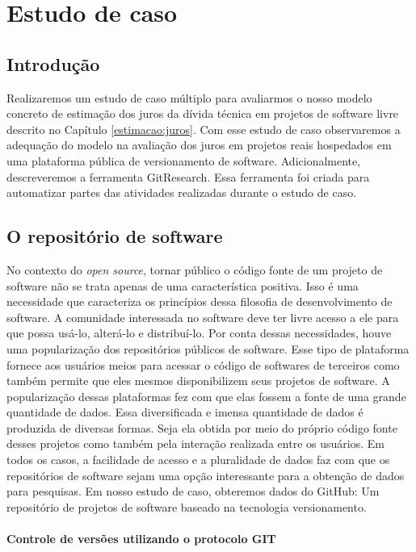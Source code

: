 \chapter{Estudo de caso}
\label{cap_estudo_caso}

\section{Introdução}

Realizaremos um estudo de caso múltiplo para avaliarmos o nosso modelo concreto de estimação dos juros da dívida técnica em projetos de software livre descrito no Capítulo \ref{estimacao:juros}.  Com esse estudo de caso observaremos a adequação do modelo na avaliação dos juros em projetos reais hospedados em uma plataforma pública de versionamento de software. Adicionalmente, descreveremos a ferramenta GitResearch. Essa ferramenta foi criada para automatizar partes das atividades realizadas durante o estudo de caso.

\section{O repositório de software}

No contexto do \textit{open source}, tornar público o código fonte de um projeto de software não se trata apenas de uma característica positiva. Isso é uma necessidade que caracteriza os princípios dessa filosofia de desenvolvimento de software. A comunidade interessada no software deve ter livre acesso a ele para que possa usá-lo, alterá-lo e distribuí-lo. Por conta dessas necessidades, houve uma popularização dos repositórios públicos de software. Esse tipo de plataforma fornece aos usuários meios para acessar o código de softwares de terceiros como também permite que eles mesmos disponibilizem seus projetos de software. A popularização dessas plataformas fez com que elas fossem a fonte de uma grande quantidade de dados. Essa diversificada e imensa quantidade de dados é produzida de diversas formas. Seja ela obtida por meio do próprio código fonte desses projetos como também pela interação realizada entre os usuários.  Em todos os casos, a facilidade de acesso e a pluralidade de dados faz com que os repositórios de software sejam uma opção interessante para a obtenção de dados para pesquisas. Em nosso estudo de caso, obteremos dados do GitHub: Um repositório de projetos  de software baseado na tecnologia versionamento.



\subsubsection{Controle de versões utilizando o protocolo GIT }



